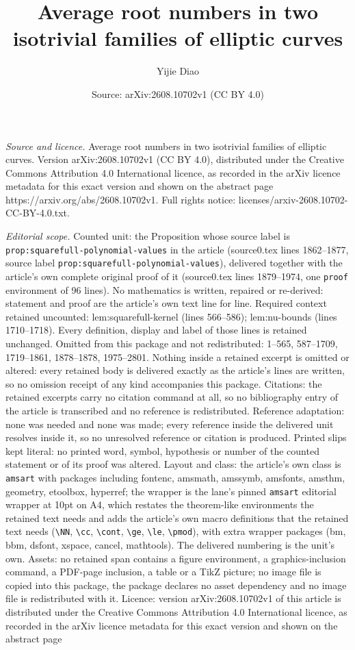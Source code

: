 \documentclass[10pt,a4paper]{amsart}
\title[Average root numbers in two isotrivial families of elliptic ]{Average root numbers in two isotrivial families of elliptic curves}
\author{Yijie Diao}
\date{Source: arXiv:2608.10702v1 (CC BY 4.0)}
\begin{document}
\maketitle

\noindent\emph{Source and licence.} Average root numbers in two isotrivial families of elliptic curves. Version arXiv:2608.10702v1 (CC BY 4.0), distributed under the Creative Commons Attribution 4.0 International licence, as recorded in the arXiv licence metadata for this exact version and shown on the abstract page https://arxiv.org/abs/2608.10702v1. Full rights notice: licenses/arxiv-2608.10702-CC-BY-4.0.txt.\par\smallskip

\noindent\textit{Editorial scope.} Counted unit: the Proposition whose source label is \texttt{prop:squarefull-polynomial-values} in the article (source0.tex lines 1862--1877, source label \texttt{prop:squarefull-polynomial-values}), delivered together with the article's own complete original proof of it (source0.tex lines 1879--1974, one \texttt{proof} environment of 96 lines). No mathematics is written, repaired or re-derived: statement and proof are the article's own text line for line. Required context retained uncounted: lem:squarefull-kernel (lines 566--586); lem:nu-bounds (lines 1710--1718). Every definition, display and label of those lines is retained unchanged. Omitted from this package and not redistributed: 1--565, 587--1709, 1719--1861, 1878--1878, 1975--2801. Nothing inside a retained excerpt is omitted or altered: every retained body is delivered exactly as the article's lines are written, so no omission receipt of any kind accompanies this package. Citations: the retained excerpts carry no citation command at all, so no bibliography entry of the article is transcribed and no reference is redistributed. Reference adaptation: none was needed and none was made; every reference inside the delivered unit resolves inside it, so no unresolved reference or citation is produced. Printed slips kept literal: no printed word, symbol, hypothesis or number of the counted statement or of its proof was altered. Layout and class: the article's own class is \texttt{amsart} with packages including fontenc, amsmath, amssymb, amsfonts, amsthm, geometry, etoolbox, hyperref; the wrapper is the lane's pinned \texttt{amsart} editorial wrapper at 10pt on A4, which restates the theorem-like environments the retained text needs and adds the article's own macro definitions that the retained text needs (\texttt{\textbackslash NN}, \texttt{\textbackslash cc}, \texttt{\textbackslash cont}, \texttt{\textbackslash ge}, \texttt{\textbackslash le}, \texttt{\textbackslash pmod}), with extra wrapper packages (bm, bbm, dsfont, xspace, cancel, mathtools). The delivered numbering is the unit's own. Assets: no retained span contains a figure environment, a graphics-inclusion command, a PDF-page inclusion, a table or a TikZ picture; no image file is copied into this package, the package declares no asset dependency and no image file is redistributed with it. Licence: version arXiv:2608.10702v1 of this article is distributed under the Creative Commons Attribution 4.0 International licence, as recorded in the arXiv licence metadata for this exact version and shown on the abstract page 
\end{document}
